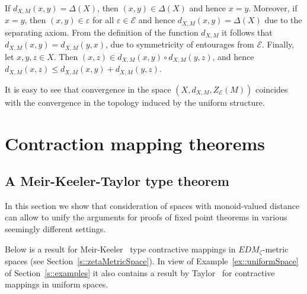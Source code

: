 \documentclass[12pt]{amsart}          %
\newcommand{\EE}{\mathcal{E}}
\begin{document}
\begin{enumerate}[wide]
 If $d_{X,M}(x,y) = \Delta(X)$, then $(x,y)\in \Delta(X)$ and hence $x = y$.  Moreover, if $x = y$, then $(x,y) \in \varepsilon$ for all $\varepsilon\in \EE$ and hence $d_{X,M}(x,y) = \Delta(X)$ due to the separating axiom.   From the definition of the function $d_{X,M}$ it follows that $d_{X,M}(x,y) = d_{X,M}(y,x)$, due to symmetricity of entourages from $\EE$.   Finally, let $x,y,z\in X$. Then $(x,z)\in d_{X,M}(x,y)\circ d_{X,M}(y,z)$, and hence $d_{X,M}(x,z)\leq d_{X,M}(x,y) + d_{X,M}(y,z).$
  
 It is easy to see that  convergence in the space $(X,d_{X,M}, Z_{\EE}(M))$ coincides with the convergence in the topology induced by the uniform structure.
\end{enumerate}

 \section{ Contraction mapping theorems}\label{s::contractionTheorems}

\subsection{A Meir-Keeler-Taylor type  theorem}
In this section we show that consideration of spaces with monoid-valued distance can allow to unify the arguments for proofs of fixed point theorems in various seemingly different settings.

Below is  a result for Meir-Keeler~\cite{Meir69} type contractive mappings {in $EDM_\zeta$-metric spaces (see Section~\ref{s::zetaMetricSpace})}. In view of Example~\ref{ex::uniformSpace} of Section~\ref{s::examples} it also contains a  result by Taylor~\cite{Taylor} for contractive mappings in uniform spaces.
\end{document}
